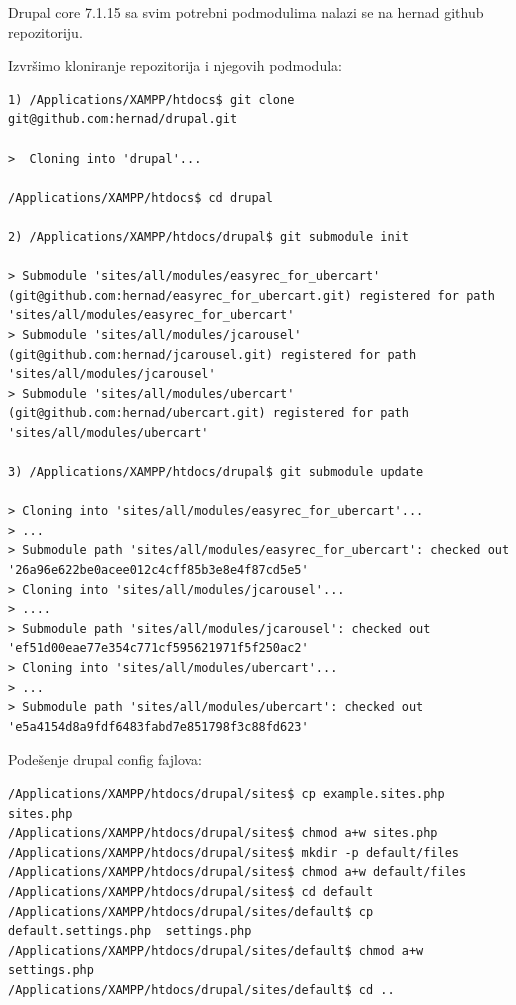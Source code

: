 \documentclass[times, utf8, seminar]{fit}
\begin{document}
{{{Drupal core 7.1.15 sa svim potrebni podmodulima nalazi se na hernad github repozitoriju. 

Izvršimo kloniranje repozitorija i njegovih podmodula:

\begin{lstlisting}
1) /Applications/XAMPP/htdocs$ git clone git@github.com:hernad/drupal.git

>  Cloning into 'drupal'...

/Applications/XAMPP/htdocs$ cd drupal

2) /Applications/XAMPP/htdocs/drupal$ git submodule init 

> Submodule 'sites/all/modules/easyrec_for_ubercart' (git@github.com:hernad/easyrec_for_ubercart.git) registered for path 'sites/all/modules/easyrec_for_ubercart'
> Submodule 'sites/all/modules/jcarousel' (git@github.com:hernad/jcarousel.git) registered for path 'sites/all/modules/jcarousel'
> Submodule 'sites/all/modules/ubercart' (git@github.com:hernad/ubercart.git) registered for path 'sites/all/modules/ubercart'

3) /Applications/XAMPP/htdocs/drupal$ git submodule update

> Cloning into 'sites/all/modules/easyrec_for_ubercart'...
> ...
> Submodule path 'sites/all/modules/easyrec_for_ubercart': checked out '26a96e622be0acee012c4cff85b3e8e4f87cd5e5'
> Cloning into 'sites/all/modules/jcarousel'...
> ....
> Submodule path 'sites/all/modules/jcarousel': checked out 'ef51d00eae77e354c771cf595621971f5f250ac2'
> Cloning into 'sites/all/modules/ubercart'...
> ...
> Submodule path 'sites/all/modules/ubercart': checked out 'e5a4154d8a9fdf6483fabd7e851798f3c88fd623'
\end{lstlisting}

Podešenje drupal config fajlova:

\begin{lstlisting}
/Applications/XAMPP/htdocs/drupal/sites$ cp example.sites.php sites.php
/Applications/XAMPP/htdocs/drupal/sites$ chmod a+w sites.php
/Applications/XAMPP/htdocs/drupal/sites$ mkdir -p default/files
/Applications/XAMPP/htdocs/drupal/sites$ chmod a+w default/files
/Applications/XAMPP/htdocs/drupal/sites$ cd default
/Applications/XAMPP/htdocs/drupal/sites/default$ cp default.settings.php  settings.php
/Applications/XAMPP/htdocs/drupal/sites/default$ chmod a+w settings.php
/Applications/XAMPP/htdocs/drupal/sites/default$ cd ..
\end{lstlisting}

}}}
\end{document}
